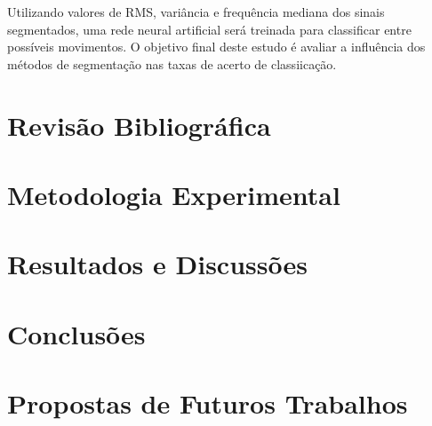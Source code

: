 \documentclass[
	12pt,				%
	openright,			%
	oneside,			%
	a4paper,			%
	english,			%
	francais,			%
	spanish,			%
	brazil				%
	]{abntex2}
\begin{document}
Utilizando valores de RMS, variância e frequência mediana dos sinais segmentados, uma rede neural artificial será treinada para classificar entre possíveis movimentos. O objetivo final deste estudo é avaliar a influência dos métodos de segmentação nas taxas de acerto de classiicação.

\chapter{Revisão Bibliográfica}


\chapter{Metodologia Experimental}


\chapter{Resultados e Discussões}


\chapter{Conclusões}

\chapter{Propostas de Futuros Trabalhos}
\end{document}
